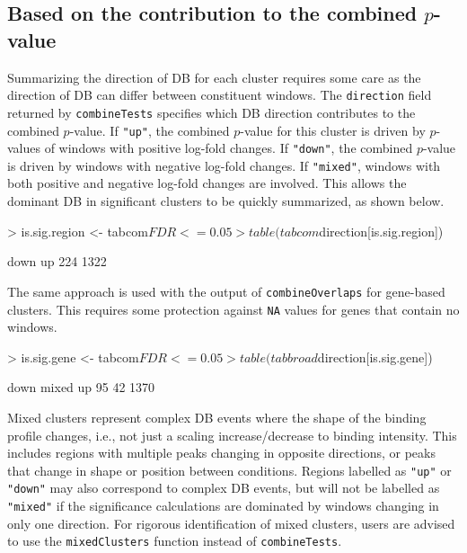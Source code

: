 \documentclass[12pt]{report}
\renewenvironment{Schunk}{\vspace{0pt}}{\vspace{0pt}}
\newcommand{\code}[1]{{\small\texttt{#1}}}
\begin{document}
\subsection{Based on the contribution to the combined $p$-value}
Summarizing the direction of DB for each cluster requires some care as the direction of DB can differ between constituent windows.
The \code{direction} field returned by \code{combineTests} specifies which DB direction contributes to the combined $p$-value.
If \code{"up"}, the combined $p$-value for this cluster is driven by $p$-values of windows with positive log-fold changes.
If \code{"down"}, the combined $p$-value is driven by windows with negative log-fold changes.
If \code{"mixed"}, windows with both positive and negative log-fold changes are involved.
This allows the dominant DB in significant clusters to be quickly summarized, as shown below.

\begin{Schunk}
\begin{Sinput}
> is.sig.region <- tabcom$FDR <= 0.05
> table(tabcom$direction[is.sig.region])
\end{Sinput}
\begin{Soutput}
down   up 
 224 1322 
\end{Soutput}
\end{Schunk}

The same approach is used with the output of \code{combineOverlaps} for gene-based clusters.
This requires some protection against \code{NA} values for genes that contain no windows.

\begin{Schunk}
\begin{Sinput}
> is.sig.gene <- tabcom$FDR <= 0.05
> table(tabbroad$direction[is.sig.gene])
\end{Sinput}
\begin{Soutput}
 down mixed    up 
   95    42  1370 
\end{Soutput}
\end{Schunk}

Mixed clusters represent complex DB events where the shape of the binding profile changes, i.e., not just a scaling increase/decrease to binding intensity.
This includes regions with multiple peaks changing in opposite directions, or peaks that change in shape or position between conditions.
Regions labelled as \code{"up"} or \code{"down"} may also correspond to complex DB events,
but will not be labelled as \code{"mixed"} if the significance calculations are dominated by windows changing in only one direction.
For rigorous identification of mixed clusters, users are advised to use the \code{mixedClusters} function instead of \code{combineTests}.
\end{document}
